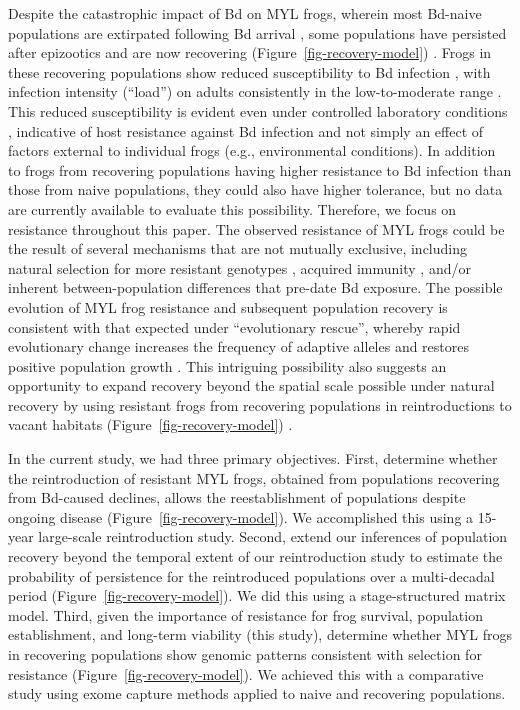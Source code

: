 \documentclass[9pt,twocolumn,twoside,lineno]{pnas-new}
\begin{document}
Despite the catastrophic impact of Bd on MYL frogs, wherein most
Bd-naive populations are extirpated following Bd arrival
\citep{vredenburg2010}, some populations have persisted after epizootics
\citep[during which Bd infection intensity on frogs is very
high,][]{briggs2010} and are now recovering
(Figure~\ref{fig-recovery-model}) \citep{knapp2016}. Frogs in these
recovering populations show reduced susceptibility to Bd infection
\citep{knapp2016}, with infection intensity (``load'') on adults
consistently in the low-to-moderate range
\citep{briggs2010, knapp2011, joseph2018}. This reduced susceptibility
is evident even under controlled laboratory conditions
\citep{knapp2016}, indicative of host resistance against Bd infection
and not simply an effect of factors external to individual frogs (e.g.,
environmental conditions). In addition to frogs from recovering
populations having higher resistance to Bd infection than those from
naive populations, they could also have higher tolerance, but no data
are currently available to evaluate this possibility. Therefore, we
focus on resistance throughout this paper. The observed resistance of
MYL frogs could be the result of several mechanisms that are not
mutually exclusive, including natural selection for more resistant
genotypes \citep{savage2016, grogan2018b}, acquired immunity
\citep{grogan2018a}, and/or inherent between-population differences that
pre-date Bd exposure. The possible evolution of MYL frog resistance and
subsequent population recovery is consistent with that expected under
``evolutionary rescue'', whereby rapid evolutionary change increases the
frequency of adaptive alleles and restores positive population growth
\citep{carlson2014, searle2020}. This intriguing possibility also
suggests an opportunity to expand recovery beyond the spatial scale
possible under natural recovery by using resistant frogs from recovering
populations in reintroductions to vacant habitats
(Figure~\ref{fig-recovery-model}) \citep{joseph2018, mendelson2019}.

In the current study, we had three primary objectives. First, determine
whether the reintroduction of resistant MYL frogs, obtained from
populations recovering from Bd-caused declines, allows the
reestablishment of populations despite ongoing disease
(Figure~\ref{fig-recovery-model}). We accomplished this using a 15-year
large-scale reintroduction study. Second, extend our inferences of
population recovery beyond the temporal extent of our reintroduction
study to estimate the probability of persistence for the reintroduced
populations over a multi-decadal period
(Figure~\ref{fig-recovery-model}). We did this using a stage-structured
matrix model. Third, given the importance of resistance for frog
survival, population establishment, and long-term viability (this
study), determine whether MYL frogs in recovering populations show
genomic patterns consistent with selection for resistance
(Figure~\ref{fig-recovery-model}). We achieved this with a comparative
study using exome capture methods applied to naive and recovering
populations.
\end{document}
